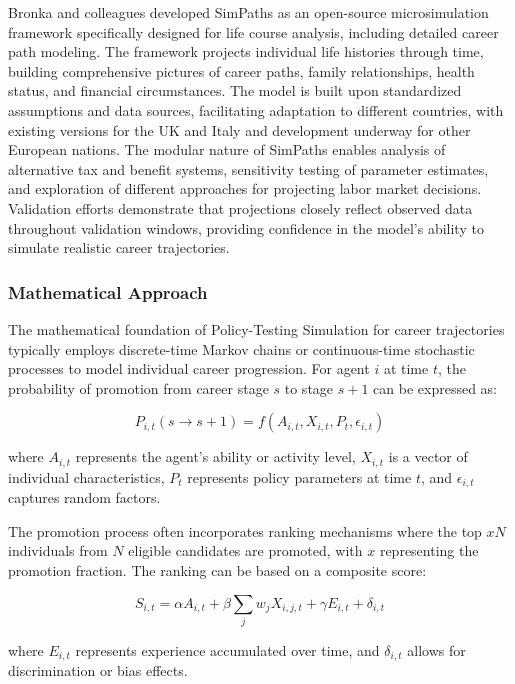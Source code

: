 \documentclass[main.tex]{subfiles}
\begin{document}
Bronka and colleagues developed SimPaths as an open-source microsimulation framework specifically designed for life course analysis, including detailed career path modeling\autocite{bronka2023}. The framework projects individual life histories through time, building comprehensive pictures of career paths, family relationships, health status, and financial circumstances. The model is built upon standardized assumptions and data sources, facilitating adaptation to different countries, with existing versions for the UK and Italy and development underway for other European nations. The modular nature of SimPaths enables analysis of alternative tax and benefit systems, sensitivity testing of parameter estimates, and exploration of different approaches for projecting labor market decisions. Validation efforts demonstrate that projections closely reflect observed data throughout validation windows, providing confidence in the model's ability to simulate realistic career trajectories.

\subsubsection{Mathematical Approach}

The mathematical foundation of Policy-Testing Simulation for career trajectories typically employs discrete-time Markov chains or continuous-time stochastic processes to model individual career progression\autocite{bullinaria2018, career-model}. For agent $i$ at time $t$, the probability of promotion from career stage $s$ to stage $s+1$ can be expressed as:

\[
    P_{i,t}(s \rightarrow s+1) = f(A_{i,t}, X_{i,t}, P_t, \epsilon_{i,t})
\]

where $A_{i,t}$ represents the agent's ability or activity level, $X_{i,t}$ is a vector of individual characteristics, $P_t$ represents policy parameters at time $t$, and $\epsilon_{i,t}$ captures random factors\autocite{career-model}.

The promotion process often incorporates ranking mechanisms where the top $xN$ individuals from $N$ eligible candidates are promoted, with $x$ representing the promotion fraction\autocite{bullinaria2018}. The ranking can be based on a composite score:

\[
    S_{i,t} = \alpha A_{i,t} + \beta \sum_{j} w_j X_{i,j,t} + \gamma E_{i,t} + \delta_{i,t}
\]

where $E_{i,t}$ represents experience accumulated over time, and $\delta_{i,t}$ allows for discrimination or bias effects\autocite{bullinaria2018}.
\end{document}

